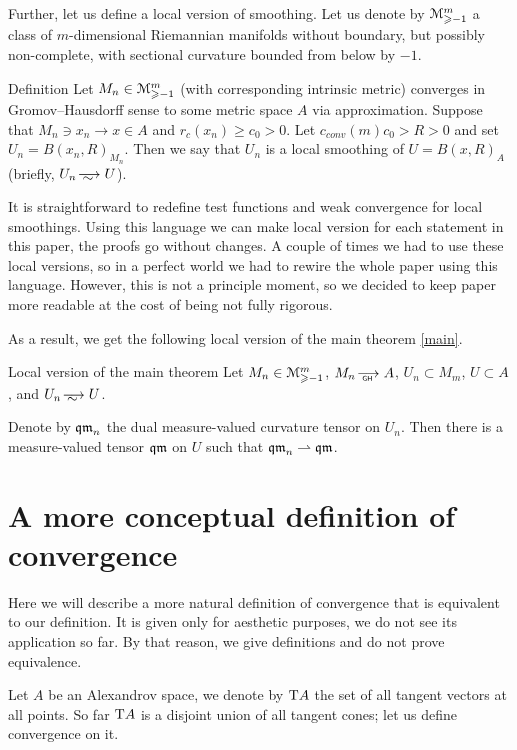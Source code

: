 Further, let us define a local version of smoothing.
Let us denote by
$\mathcal M_{\geqslant -1}^m$ a class of $m$-dimensional Riemannian 
manifolds without boundary, but possibly non-complete, with sectional curvature bounded
from below by $-1$.

\begin{rdef}{Definition}
Let 
$M_n\in\mathcal M_{\geqslant -1}^m$ (with corresponding intrinsic metric)
converges in Gromov--Hausdorff sense to some metric space $A$ via
approximation.
Suppose that $M_n\ni x_n\to x\in A$
and $r_c(x_n)\ge c_0>0$. Let $c_{conv}(m)c_0 > R>0$ and set
$U_n=B(x_n,R)_{M_n}$.
Then we say that $U_n$ is a local smoothing of $U=B(x,R)_A$ (briefly, $U_n\smooths{} U$).
\end{rdef}

It is straightforward to redefine test functions and weak convergence for local smoothings.
Using this language we can make local version for each statement in this paper, the proofs go without changes.
A couple of times we had to use these local versions, so in a perfect world we had to rewire the whole paper using this language.
However, this is not a principle moment,
so we decided to keep paper more readable at the cost of being not fully rigorous. 

As a result, we get the following local version of the main theorem \ref{main}.
 
\begin{thm}{Local version of the main theorem}\label{mainloc}
Let   
$M_n\in\mathcal M_{\geqslant -1}^m$,
$M_n\GHto A$, $U_n\subset M_m$,
  $U\subset A$, and $U_n\smooths{} U$.
  
Denote by $\operatorname{\mathfrak{qm}}_n$ the dual measure-valued curvature tensor on $U_n$.
Then there is a measure-valued tensor $\operatorname{\mathfrak{qm}}$ on $U$ such that $\operatorname{\mathfrak{qm}}_n\rightharpoonup \operatorname{\mathfrak{qm}}$.
\end{thm}

\section{A more conceptual definition of convergence}

Here we will describe a more natural definition of convergence that is equivalent to our definition.
It is given only for aesthetic purposes, we do not see its application so far.
By that reason, we give definitions and do not prove equivalence.

Let $A$ be an Alexandrov space, we denote by $\mathrm{T} A$ the set of all tangent vectors at all points.
So far $\mathrm{T} A$ is a disjoint union of all tangent cones;
let us define convergence on it.

